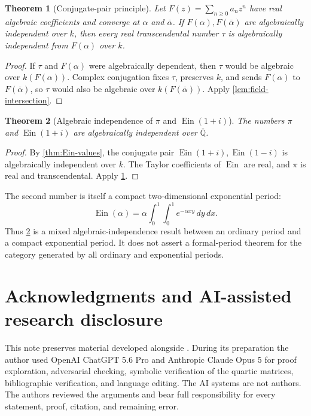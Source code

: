 \documentclass[11pt]{article}
\numberwithin{equation}{section}
\newtheorem{theorem}{Theorem}[section]
\theoremstyle{definition}
\theoremstyle{remark}
\newcommand{\Qbar}{\overline{\mathbb Q}}
\newcommand{\Ein}{\operatorname{Ein}}
\begin{document}
\begin{theorem}[Conjugate-pair principle]\label{thm:conjugate-pair}
Let $F(z)=\sum_{n\ge0}a_nz^n$ have real algebraic coefficients and converge
at $\alpha$ and $\overline\alpha$.  If
$F(\alpha),F(\overline\alpha)$ are algebraically independent over $k$, then
every real transcendental number $\tau$ is algebraically independent from
$F(\alpha)$ over $k$.
\end{theorem}

\begin{proof}
If $\tau$ and $F(\alpha)$ were algebraically dependent, then $\tau$ would be
algebraic over $k(F(\alpha))$.  Complex conjugation fixes $\tau$, preserves
$k$, and sends $F(\alpha)$ to $F(\overline\alpha)$, so $\tau$ would also be
algebraic over $k(F(\overline\alpha))$.  Apply
\cref{lem:field-intersection}.
\end{proof}

\begin{theorem}[Algebraic independence of $\pi$ and $\Ein(1+i)$]
\label{thm:pi-Ein}
The numbers $\pi$ and $\Ein(1+i)$ are algebraically independent over
$\Qbar$.
\end{theorem}

\begin{proof}
By \cref{thm:Ein-values}, the conjugate pair
$\Ein(1+i),\Ein(1-i)$ is algebraically independent over $k$.  The Taylor
coefficients of $\Ein$ are real, and $\pi$ is real and transcendental.  Apply
\cref{thm:conjugate-pair}.
\end{proof}

The second number is itself a compact two-dimensional exponential period:
\begin{equation}\label{eq:Ein-square}
  \Ein(\alpha)
  =\alpha\int_0^1\int_0^1e^{-\alpha xy}\,dy\,dx.
\end{equation}
Thus \cref{thm:pi-Ein} is a mixed algebraic-independence result between an
ordinary period and a compact exponential period.  It does not assert a
formal-period theorem for the category generated by all ordinary and
exponential periods.

\section*{Acknowledgments and AI-assisted research disclosure}

This note preserves material developed alongside \cite{LongEIT,LongLinearKZ,
LongPolynomialKZ}.  During its preparation the author used OpenAI ChatGPT
5.6 Pro and Anthropic Claude Opus 5 for proof exploration, adversarial
checking, symbolic verification of the quartic matrices, bibliographic
verification, and language editing.  The AI systems are not authors.  The
authors reviewed the arguments and bear full responsibility for every
statement, proof, citation, and remaining error.
\end{document}
